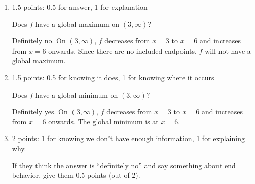 \documentclass{article}
\begin{document}
\begin{enumerate}
\begin{enumerate}
    \begin{problem}[\vfill]
      Does $f$ have a global minimum on $[-3, 5]$? 
    \end{problem}

    \begin{solution}
      Definitely yes. Since $f$ increases 
      from $x=-3$ to $x=2$ and then decreases from $x=2$ to $x=5$, the global minimum
      could occur at $x=-3$ or at $x=5$. 
    \end{solution}

  \item

    \begin{grading}
      1.5 points: 0.5 for answer, 1 for explanation 
    \end{grading}

    \begin{problem}[\vfill\newpage]
      Does $f$ have a global maximum on $(3, \infty)$?
    \end{problem}

    \begin{solution}
      Definitely no. On $(3, \infty)$, $f$ decreases from $x=3$ to $x=6$ and
      increases from $x=6$ onwards. Since there are no included endpoints, $f$
      will not have a global maximum.
    \end{solution}

  \item

    \begin{grading}
      1.5 points: 0.5 for knowing it does, 1 for knowing where it occurs
    \end{grading}

    \begin{problem}[\vfill]
      Does $f$ have a global minimum on $(3, \infty)$?
    \end{problem}

    \begin{solution}
      Definitely yes. On $(3, \infty)$, $f$ decreases from $x=3$ to $x=6$ and
      increases from $x=6$ onwards. The global minimum is at $x=6$.
    \end{solution}

  \item

    \begin{grading}
      2 points: 1 for knowing we don't have enough information, 1 for explaining why.

      If they think the answer is ``definitely no'' and say something about end behavior, give them 0.5 points (out of 2).
    \end{grading}


\end{enumerate}
\end{enumerate}
\end{document}
